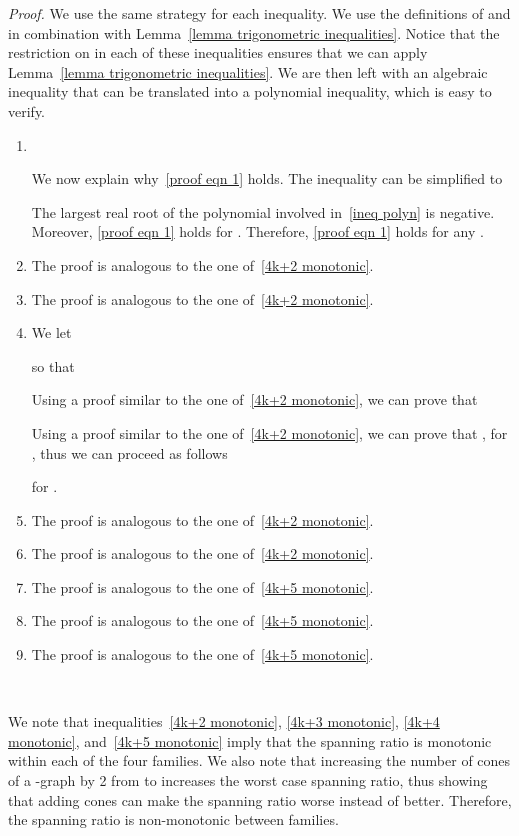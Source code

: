 \documentclass[12pt]{article}
\newenvironment{proof}{\emph{Proof.}}{\hfill \\}
\def\Item{\item\abovedisplayskip=0pt\abovedisplayshortskip=0pt~\vspace*{-\baselineskip}}
\begin{document}
\begin{proof}
We use the same strategy for each inequality. We use the definitions of  and  in combination with Lemma~\ref{lemma trigonometric inequalities}. Notice that the restriction on  in each of these inequalities ensures that we can apply Lemma~\ref{lemma trigonometric inequalities}. We are then left with an algebraic inequality that can be translated into a polynomial inequality, which is easy to verify. 
\begin{enumerate}
\Item 

We now explain why~\eqref{proof eqn 1} holds. The inequality  can be simplified to

The largest real root of the polynomial involved in~\eqref{ineq polyn} is negative. Moreover, \eqref{proof eqn 1} holds for . Therefore, \eqref{proof eqn 1} holds for any .

\item The proof is analogous to the one of~\eqref{4k+2 monotonic}.

\item The proof is analogous to the one of~\eqref{4k+2 monotonic}.

\item We let

so that

Using a proof similar to the one of~\eqref{4k+2 monotonic}, we can prove that

Using a proof similar to the one of~\eqref{4k+2 monotonic}, we can prove that , for , thus we can proceed as follows

for .

\item The proof is analogous to the one of~\eqref{4k+2 monotonic}.

\item The proof is analogous to the one of~\eqref{4k+2 monotonic}.

\item The proof is analogous to the one of~\eqref{4k+5 monotonic}.

\item The proof is analogous to the one of~\eqref{4k+5 monotonic}.

\item The proof is analogous to the one of~\eqref{4k+5 monotonic}.
\end{enumerate}
\vspace{-1.5em}
\end{proof}

We note that inequalities~\eqref{4k+2 monotonic}, \eqref{4k+3 monotonic}, \eqref{4k+4 monotonic}, and~\eqref{4k+5 monotonic} imply that the spanning ratio is monotonic within each of the four families. We also note that increasing the number of cones of a -graph by 2 from  to  increases the worst case spanning ratio, thus showing that adding cones can make the spanning ratio worse instead of better. Therefore, the spanning ratio is non-monotonic between families. 
\end{document}
